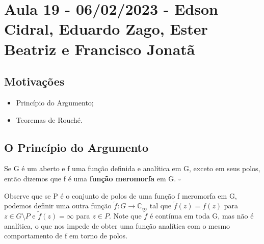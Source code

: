 \documentclass[complex.tex]{subfiles}
\begin{document}
\section{Aula 19 - 06/02/2023 - Edson Cidral, Eduardo Zago, Ester Beatriz e Francisco Jonatã}
\subsection{Motivações}
\begin{itemize}
	\item Princípio do Argumento;
	\item Teoremas de Rouché.
\end{itemize}
\subsection{O Princípio do Argumento}
\begin{def*}
	Se G é um aberto e f uma função definida e analítica em G, exceto em seus polos, então dizemos que f é uma \textbf{função meromorfa} em G. \(\square\)
\end{def*}
Observe que se P é o conjunto de polos de uma função f meromorfa em G, podemos definir uma outra função \(\tilde{f}:G\rightarrow \mathbb{C}_{\infty}\) tal que
\(\tilde{f}(z) = f(z)\) para \(z\in G\setminus{P}\) e \(\tilde{f}(z) = \infty\) para \(z\in P\). Note que \(\tilde{f}\) é contínua em toda G, mas não é analítica,
o que nos impede de obter uma função analítica com o mesmo comportamento de f em torno de polos.
\end{document}

